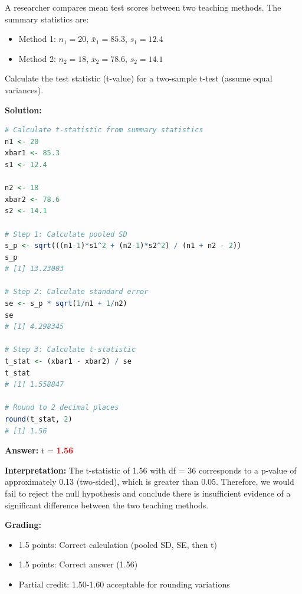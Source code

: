 \documentclass[11pt]{article}
\begin{document}
A researcher compares mean test scores between two teaching methods. The summary statistics are:

\begin{itemize}
\item Method 1: $n_1 = 20$, $\bar{x}_1 = 85.3$, $s_1 = 12.4$
\item Method 2: $n_2 = 18$, $\bar{x}_2 = 78.6$, $s_2 = 14.1$
\end{itemize}

Calculate the test statistic (t-value) for a two-sample t-test (assume equal variances).

\vspace{0.3cm}

\textbf{Solution:}

\begin{lstlisting}[language=R,basicstyle=\small\ttfamily,frame=single]
# Calculate t-statistic from summary statistics
n1 <- 20
xbar1 <- 85.3
s1 <- 12.4

n2 <- 18
xbar2 <- 78.6
s2 <- 14.1

# Step 1: Calculate pooled SD
s_p <- sqrt(((n1-1)*s1^2 + (n2-1)*s2^2) / (n1 + n2 - 2))
s_p
# [1] 13.23003

# Step 2: Calculate standard error
se <- s_p * sqrt(1/n1 + 1/n2)
se
# [1] 4.298345

# Step 3: Calculate t-statistic
t_stat <- (xbar1 - xbar2) / se
t_stat
# [1] 1.558847

# Round to 2 decimal places
round(t_stat, 2)
# [1] 1.56
\end{lstlisting}

\textbf{Answer:} t = \textcolor{red}{\textbf{1.56}}

\textbf{Interpretation:} The t-statistic of 1.56 with df = 36 corresponds to a p-value of approximately 0.13 (two-sided), which is greater than 0.05. Therefore, we would fail to reject the null hypothesis and conclude there is insufficient evidence of a significant difference between the two teaching methods.

\textbf{Grading:}
\begin{itemize}
\item 1.5 points: Correct calculation (pooled SD, SE, then t)
\item 1.5 points: Correct answer (1.56)
\item Partial credit: 1.50-1.60 acceptable for rounding variations
\end{itemize}

\vspace{1cm}
\end{document}
